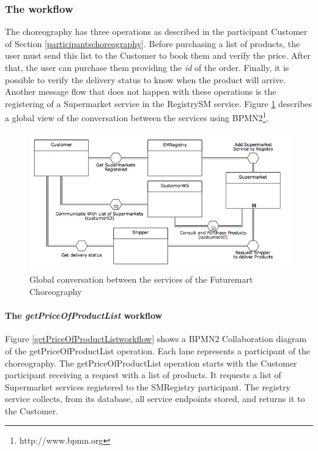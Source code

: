 \subsubsection{The workflow}
The choreography has three operations as described in the participant Customer of Section \ref{participantschoreography}. Before purchasing a list of products, the user must send this list to the Customer to book them and verify the price. After that, the user can purchase them providing the \emph{id} of the order. Finally, it is possible to verify the delivery status to know when the product will arrive. Another message flow that does not happen with these operations is the registering of a Supermarket service in the RegistrySM service. Figure \ref{futuremartConversation} describes a global view of the conversation between the services using BPMN2\footnote{http://www.bpmn.org}.

\begin{figure}[htbp]
\begin{center}
	\includegraphics[width=\textwidth]{images/futuremartConversation}
\caption{Global conversation between the services of the Futuremart Choreography}
\label{futuremartConversation}
\end{center}
\end{figure}

\paragraph{The \emph{getPriceOfProductList} workflow\\}
Figure \ref{getPriceOfProductListworkflow} shows a BPMN2 Collaboration diagram of the getPriceOfProductList operation. Each lane represents a participant of the choreography. The getPriceOfProductList operation starts with the Customer participant receiving a request with a list of products. It requests a list of Supermarket services registered to the SMRegistry participant. The registry service collects, from its database, all service endpoints stored, and returns it to the Customer.

